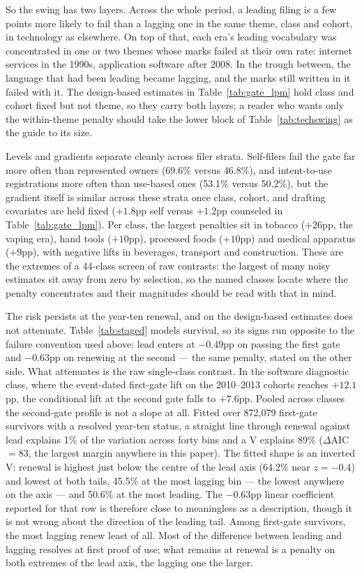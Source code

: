 So the swing has two layers. Across the whole period, a leading filing is a
few points more likely to fail than a lagging one in the same theme, class
and cohort, in technology as elsewhere. On top of that, each era's leading
vocabulary was concentrated in one or two themes whose marks failed at
their own rate: internet services in the 1990s, application software after
2008. In the trough between, the language that had been leading became
lagging, and the marks still written in it failed with it. The
design-based estimates in Table~\ref{tab:gate_lpm} hold class and cohort
fixed but not theme, so they carry both layers; a reader who wants only the
within-theme penalty should take the lower block of Table~\ref{tab:techswing}
as the guide to its size.

Levels and gradients separate cleanly across filer strata. Self-filers
fail the gate far more often than represented owners (69.6\% versus
46.8\%), and intent-to-use registrations more often than use-based ones
(53.1\% versus 50.2\%),
but the \dkl{} gradient itself is similar across these strata once class,
cohort, and drafting covariates are held fixed ($+1.8$pp self versus
$+1.2$pp counseled in Table~\ref{tab:gate_lpm}). Per class, the largest penalties sit in tobacco ($+26$pp, the
vaping era), hand tools ($+10$pp), processed foods ($+10$pp) and medical
apparatus ($+9$pp), with negative lifts in beverages, transport and
construction. These are the extremes of a 44-class screen of raw
contrasts: the largest of many noisy estimates sit away from zero by
selection, so the named classes locate where the penalty concentrates and
their magnitudes should be read with that in mind.

The risk persists at the year-ten renewal, and on the design-based
estimates does not attenuate. Table~\ref{tab:staged} models survival, so its
signs run opposite to the failure convention used above: lead enters at
$-0.49$pp on passing the first gate and $-0.63$pp on renewing at the
second --- the same penalty, stated on the other side. What attenuates is
the raw single-class contrast. In the
software diagnostic class, where the event-dated first-gate lift on the
2010--2013 cohorts reaches $+12.1$pp, the conditional lift at the second
gate falls to $+7.6$pp. Pooled across classes the second-gate profile is not
a slope at all. Fitted over 872{,}079 first-gate survivors with a resolved
year-ten status, a straight line through renewal against lead explains 1\% of
the variation across forty bins and a V explains 89\%
($\Delta$AIC $= 83$, the largest margin anywhere in this paper). The fitted shape is an inverted V: renewal is highest just below the
centre of the lead axis (64.2\% near $z = -0.4$) and lowest at both
tails, 45.5\% at the most lagging bin --- the lowest anywhere on the
axis --- and 50.6\% at the most leading. The
$-0.63$pp linear coefficient reported for that row is therefore close to
meaningless as a description, though it is not wrong about the direction of the
leading tail. Among first-gate survivors, the most lagging renew least of all. Most of
the difference between leading and lagging resolves at first proof of use;
what remains at renewal is a penalty on both extremes of the lead axis,
the lagging one the larger.

